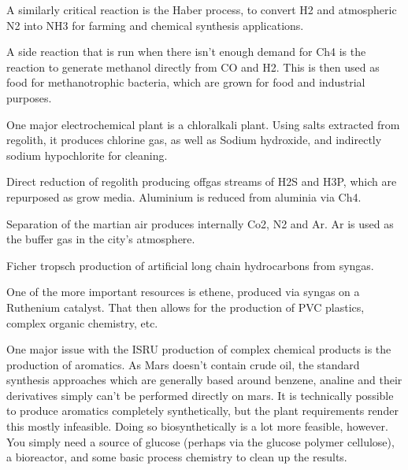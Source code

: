 \documentclass[10pt]{article}
\begin{document}
A similarly critical reaction is the Haber process, to convert H2 and atmospheric N2 into NH3 for farming and chemical synthesis applications.

A side reaction that is run when there isn't enough demand for Ch4 is the reaction to generate methanol directly from CO and H2. This is then used as food for methanotrophic bacteria, which are grown for food and industrial purposes.

One major electrochemical plant is a chloralkali plant. Using salts extracted from regolith, it produces chlorine gas, as well as Sodium hydroxide, and indirectly sodium hypochlorite for cleaning.

Direct reduction of regolith producing offgas streams of H2S and H3P, which are repurposed as grow media. Aluminium is reduced from aluminia via Ch4.

Separation of the martian air produces internally Co2, N2 and Ar. Ar is used as the buffer gas in the city's atmosphere.

Ficher tropsch production of artificial long chain hydrocarbons from syngas.

One of the more important resources is ethene, produced via syngas on a Ruthenium catalyst. That then allows for the production of PVC plastics, complex organic chemistry, etc.

One major issue with the ISRU production of complex chemical products is the production of aromatics. As Mars doesn't contain crude oil, the standard synthesis approaches which are generally based around benzene, analine and their derivatives simply can't be performed directly on mars. It is technically possible to produce aromatics completely synthetically, but the plant requirements render this mostly infeasible. Doing so biosynthetically is a lot more feasible, however. You simply need a source of glucose (perhaps via the glucose polymer cellulose), a bioreactor, and some basic process chemistry to clean up the results.
\end{document}
